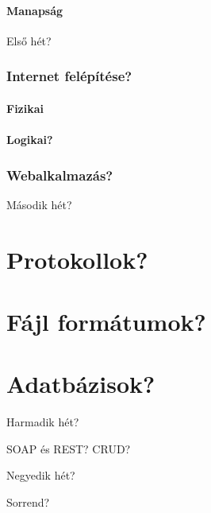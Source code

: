 \documentclass[a4paper, 12pt, oneside]{article}
\begin{document}
\subsection*{Manapság}

Első hét?

\section{Internet felépítése?}
\subsection*{Fizikai}

\subsection*{Logikai?}

\section{Webalkalmazás?}

Második hét?

\part{Protokollok?}
\part{Fájl formátumok?}
\part{Adatbázisok?}

Harmadik hét?

SOAP és REST? CRUD?

Negyedik hét?

Sorrend?
\end{document}
